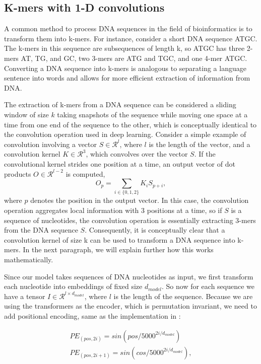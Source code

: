 \documentclass{article}
\begin{document}
\subsection{K-mers with 1-D convolutions}
A common method to process DNA sequences in the field of bioinformatics is to transform them into k-mers. For instance, consider a short DNA sequence ATGC. The k-mers in this sequence are subsequences of length k, so ATGC has three 2-mers AT, TG, and GC, two 3-mers are ATG and TGC, and one 4-mer ATGC. Converting a DNA sequence into k-mers is analogous to separating a language sentence into words and allows for more efficient extraction of information from DNA.

The extraction of k-mers from a DNA sequence can be considered a sliding window of size $k$ taking snapshots of the sequence while moving one space at a time from one end of the sequence to the other, which is conceptually identical to the convolution operation used in deep learning. Consider a simple example of convolution involving a vector $S\in \mathcal{R}^l$, where $l$ is the length of the vector, and a convolution kernel $K\in \mathcal{R}^3$, which convolves over the vector $S$. If the convolutional kernel strides one position at a time, an output vector of dot products $O\in \mathcal{R}^{l-2}$ is computed,
\begin{equation}
O_p= \sum_{i \in \{0,1,2\}} K_i S_{p+i},
\end{equation}
where $p$ denotes the position in the output vector. In this case, the convolution operation aggregates local information with 3 positions at a time, so if $S$ is a sequence of nucleotides, the convolution operation is essentially extracting 3-mers from the DNA sequence $S$. Consequently, it is conceptually clear that a convolution kernel of size k can be used to transform a DNA sequence into k-mers. In the next paragraph, we will explain further how this works mathematically. 

Since our model takes sequences of DNA nucleotides as input, we first transform each nucleotide into embeddings of fixed size $d_{model}$. So now for each sequence we have a tensor $I \in  \mathcal{R}^{l\times d_{model}}$, where $l$ is the length of the sequence. Because we are using the transformers as the encoder, which is permutation invariant, we need to add positional encoding, same as the implementation in \cite{transformer_paper}:

\begin{align}
PE_{(pos,2i)}=sin(pos/5000^{2i/d_{model}})\\
PE_{(pos,2i+1)}=sin(cos/5000^{2i/d_{model}}),
\end{align}
\end{document}
